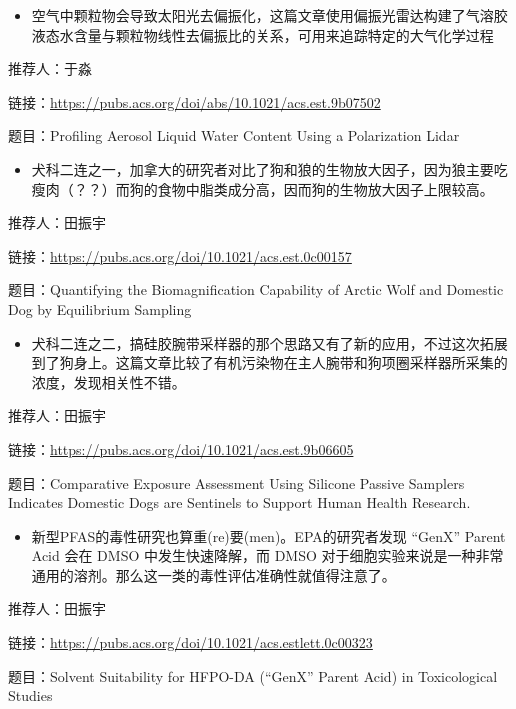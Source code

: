 \documentclass[]{book}
\providecommand{\tightlist}{%
  \setlength{\itemsep}{0pt}\setlength{\parskip}{0pt}}
\begin{document}
\begin{itemize}
\tightlist
\item
  空气中颗粒物会导致太阳光去偏振化，这篇文章使用偏振光雷达构建了气溶胶液态水含量与颗粒物线性去偏振比的关系，可用来追踪特定的大气化学过程
\end{itemize}

推荐人：于淼

链接：\url{https://pubs.acs.org/doi/abs/10.1021/acs.est.9b07502}

题目：Profiling Aerosol Liquid Water Content Using a Polarization Lidar

\begin{itemize}
\tightlist
\item
  犬科二连之一，加拿大的研究者对比了狗和狼的生物放大因子，因为狼主要吃瘦肉（？？）而狗的食物中脂类成分高，因而狗的生物放大因子上限较高。
\end{itemize}

推荐人：田振宇

链接：\url{https://pubs.acs.org/doi/10.1021/acs.est.0c00157}

题目：Quantifying the Biomagnification Capability of Arctic Wolf and Domestic Dog by Equilibrium Sampling

\begin{itemize}
\tightlist
\item
  犬科二连之二，搞硅胶腕带采样器的那个思路又有了新的应用，不过这次拓展到了狗身上。这篇文章比较了有机污染物在主人腕带和狗项圈采样器所采集的浓度，发现相关性不错。
\end{itemize}

推荐人：田振宇

链接：\url{https://pubs.acs.org/doi/10.1021/acs.est.9b06605}

题目：Comparative Exposure Assessment Using Silicone Passive Samplers Indicates Domestic Dogs are Sentinels to Support Human Health Research.

\begin{itemize}
\tightlist
\item
  新型PFAS的毒性研究也算重(re)要(men)。EPA的研究者发现 ``GenX'' Parent Acid 会在 DMSO 中发生快速降解，而 DMSO 对于细胞实验来说是一种非常通用的溶剂。那么这一类的毒性评估准确性就值得注意了。
\end{itemize}

推荐人：田振宇

链接：\url{https://pubs.acs.org/doi/10.1021/acs.estlett.0c00323}

题目：Solvent Suitability for HFPO-DA (``GenX'' Parent Acid) in Toxicological Studies
\end{document}
